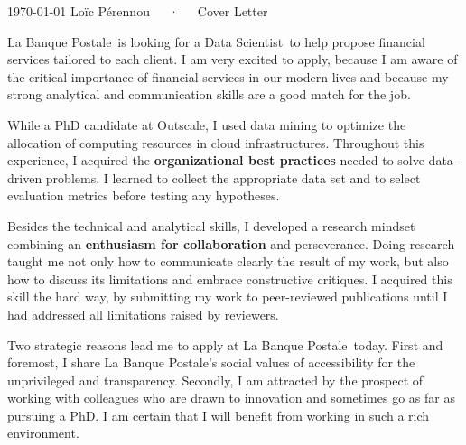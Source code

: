 \documentclass[11pt, a4paper]{awesome-cv}
\newcommand{\company}{La Banque Postale}
\newcommand{\job}{Data Scientist}
\begin{document}
\makecvheader[R]

\makecvfooter
  {\today}
  {Loïc Pérennou~~~·~~~Cover Letter}
  {}

\makelettertitle

\begin{cvletter}
\company~is looking for a \job~to help propose financial services tailored to each client. 
I am very excited to apply, because I am aware of the critical importance of financial services in our modern lives and because my strong analytical and communication skills are a good match for the job. 

While a PhD candidate at Outscale, I used data mining to optimize the allocation of computing resources in cloud infrastructures. 
Throughout this experience, I acquired the \textbf{organizational best practices} needed to solve data-driven problems.  
I learned to collect the appropriate data set and to select evaluation metrics before testing any hypotheses. 

Besides the technical and analytical skills, I developed a research mindset combining an \textbf{enthusiasm for collaboration} and perseverance.  
Doing research taught me not only how to communicate clearly the result of my work, but also how to discuss its limitations and embrace constructive critiques.  
I acquired this skill the hard way, by submitting my work to peer-reviewed publications until I had addressed all limitations raised by reviewers. 

Two strategic reasons lead me to apply at \company~today.   
First and foremost, I share \company's social values of accessibility for the unprivileged and transparency. 
Secondly, I am attracted by the prospect of working with colleagues who are drawn to innovation and sometimes go as far as pursuing a PhD. 
I am certain that I will benefit from working in such a rich environment. 


\end{cvletter}
\end{document}
